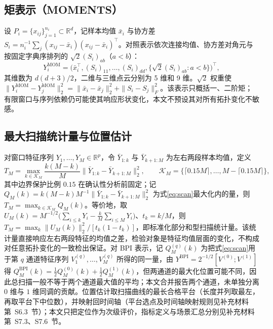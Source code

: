 \subsection{矩表示（MOMENTS）}\label{sec:moments}
设 $P_i=\{x_{ij}\}_{j=1}^{n_i}\subset\mathbb R^d$，记样本均值 $\bar x_i$ 与协方差 $S_i=n_i^{-1}\sum_j(x_{ij}-\bar x_i)(x_{ij}-\bar x_i)^\top$。对照表示依次连接均值、协方差对角元与按固定字典序排列的 $\sqrt2(S_i)_{ab}$（$a<b$）：
\begin{equation}\label{eq:moments}
 Y_i^{\mathrm{MOM}}
 =\bigl(\bar x_i^\top,(S_i)_{11},\ldots,(S_i)_{dd},
 \{\sqrt2(S_i)_{ab}:a<b\}\bigr)^\top,
\end{equation}
其维数为 $d(d+3)/2$，二维与三维点云分别为 5 维和 9 维。$\sqrt2$ 权重使 $\|Y_i^{\mathrm{MOM}}-Y_j^{\mathrm{MOM}}\|_2^2=\|\bar x_i-\bar x_j\|_2^2+\|S_i-S_j\|_F^2$。该表示只概括一、二阶矩；有限窗口与序列依赖仍可能使其响应形状变化，本文不预设其对所有拓扑变化不敏感。

\subsection{最大扫描统计量与位置估计}\label{sec:scan}
对窗口特征序列 $Y_1,\ldots,Y_M\in\mathbb R^p$，令 $\bar Y_{1:k}$ 与 $\bar Y_{k+1:M}$ 为左右两段样本均值，定义
\begin{equation}\label{eq:scan}
 T_M=\max_{k\in\mathcal K_M}\frac{k(M-k)}{M}
 \bigl\|\bar Y_{1:k}-\bar Y_{k+1:M}\bigr\|_2^2,
 \qquad
 \mathcal K_M=\{\lceil0.15M\rceil,\ldots,M-\lceil0.15M\rceil\},
\end{equation}
其中边界保护比例 $0.15$ 在确认性分析前固定；记 $Q_M(k)=k(M-k)M^{-1}\|\bar Y_{1:k}-\bar Y_{k+1:M}\|_2^2$ 为式\eqref{eq:scan}最大化内的量，则 $T_M=\max_{k\in\mathcal K_M}Q_M(k)$。等价地，取 $U_M(k)=M^{-1/2}\bigl(\sum_{i\le k}Y_i-\frac{k}{M}\sum_{i\le M}Y_i\bigr)$、$t_k=k/M$，则 $T_M=\max_k\|U_M(k)\|_2^2/[t_k(1-t_k)]$，即标准化部分和型扫描统计量\cite{CsorgoHorvath1997}。该统计量直接响应左右两段特征的均值之差，检验对象是特征均值层面的变化，不构成对任意拓扑变化的一致检出保证。对 BPI 表示，记 $Q_M^{(q)}(k)$ 为把式\eqref{eq:scan}用于第 $q$ 通道特征序列 $V_1^{(q)},\ldots,V_M^{(q)}$ 所得的同一量，由 $Y^{\mathrm{BPI}}=2^{-1/2}[V^{(0)};V^{(1)}]$ 得 $Q_M^{\mathrm{BPI}}(k)=\tfrac12Q_M^{(0)}(k)+\tfrac12Q_M^{(1)}(k)$，但两通道的最大化位置可能不同，因此总扫描一般不等于两个通道最大值的平均；本文合并报告两个通道，未单独分离 $0$ 维与 $1$ 维同调的贡献。位置估计取扫描曲线的最长合格平台（长度并列取最左，再取平台下中位数），并映射回时间轴（平台选点及时间轴映射规则见补充材料第~S6.3~节）；本文只把定位作为次级评价，指标定义与场景汇总分别见补充材料第~S7.3、S7.6~节。

